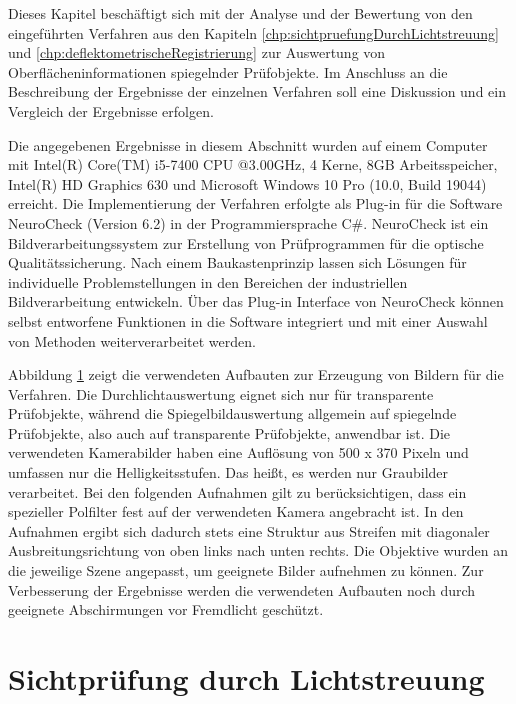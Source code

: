 Dieses Kapitel beschäftigt sich mit der Analyse und der Bewertung von den eingeführten Verfahren aus den Kapiteln \ref{chp:sichtpruefungDurchLichtstreuung} und \ref{chp:deflektometrischeRegistrierung} zur Auswertung von Oberflächeninformationen spiegelnder Prüfobjekte.
Im Anschluss an die Beschreibung der Ergebnisse der einzelnen Verfahren soll eine Diskussion und ein Vergleich der Ergebnisse erfolgen.

\p
Die angegebenen Ergebnisse in diesem Abschnitt wurden auf einem Computer mit Intel(R) Core(TM) i5-7400 CPU @3.00GHz, 4 Kerne, 8GB Arbeitsspeicher, Intel(R) HD Graphics 630 und Microsoft Windows 10 Pro (10.0, Build 19044) erreicht.
Die Implementierung der Verfahren erfolgte als Plug-in für die Software NeuroCheck (Version 6.2) in der Programmiersprache C\#.
NeuroCheck ist ein Bildverarbeitungssystem zur Erstellung von Prüfprogrammen für die optische Qualitätssicherung.
Nach einem Baukastenprinzip lassen sich Lösungen für individuelle Problemstellungen in den Bereichen der industriellen Bildverarbeitung entwickeln.
Über das Plug-in Interface von NeuroCheck können selbst entworfene Funktionen in die Software integriert und mit einer Auswahl von Methoden weiterverarbeitet werden.

{
	\begin{figure}[H]
		\centering
		
		\label{tikz:abbAufbauFotos}
	\end{figure}
}

\noindent
Abbildung \ref{tikz:abbAufbauFotos} zeigt die verwendeten Aufbauten zur Erzeugung von Bildern für die Verfahren.
Die Durchlichtauswertung eignet sich nur für transparente Prüfobjekte, während die Spiegelbildauswertung allgemein auf spiegelnde Prüfobjekte, also auch auf transparente Prüfobjekte, anwendbar ist.
Die verwendeten Kamerabilder haben eine Auflösung von 500 x 370 Pixeln und umfassen nur die Helligkeitsstufen. 
Das heißt, es werden nur Graubilder verarbeitet.
Bei den folgenden Aufnahmen gilt zu berücksichtigen, dass ein spezieller Polfilter fest auf der verwendeten Kamera angebracht ist.
In den Aufnahmen ergibt sich dadurch stets eine Struktur aus Streifen mit diagonaler Ausbreitungsrichtung von oben links nach unten rechts.
Die Objektive wurden an die jeweilige Szene angepasst, um geeignete Bilder aufnehmen zu können.
Zur Verbesserung der Ergebnisse werden die verwendeten Aufbauten noch durch geeignete Abschirmungen vor Fremdlicht geschützt.

{
	\FloatBarrier
    \section{Sichtprüfung durch Lichtstreuung}
    \label{sec:ergebnisseSichtpruefungDurchLichtstreuung}
    
}

